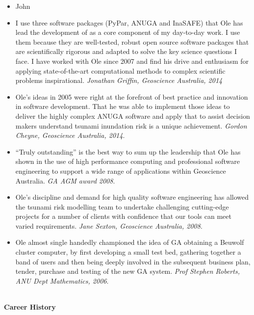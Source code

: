 \documentclass[11pt,a4paper]{article}
\begin{document}
\begin{itemize}
  \item John
  \item I use three software packages (PyPar, ANUGA and InaSAFE) that Ole has lead the development of as a core component of my day-to-day work. I use them because they are well-tested, robust open source software packages that are scientifically rigorous and adapted to solve the key science questions I face. I have worked with Ole since 2007 and find his drive and enthusiasm for applying state-of-the-art computational methods to complex scientific problems inspirational. \emph{Jonathan Griffin, Geoscience Australia, 2014}
  \item Ole’s ideas in 2005 were right at the forefront of best practice and innovation in software development. That he was able to implement those ideas to deliver the highly complex ANUGA software and apply that to assist decision makers understand tsunami inundation risk is a unique achievement. \emph{Gordon Cheyne, Geoscience Australia, 2014}.
  \item “Truly outstanding” is the best way to sum up the leadership that Ole has shown in the use of high performance computing and professional software engineering to support a wide range of applications within Geoscience Australia. \emph{GA AGM award 2008}.
  \item Ole’s discipline and demand for high quality software engineering has allowed the tsunami risk modelling team to undertake challenging cutting-edge projects for a number of clients with confidence that our tools can meet varied requirements. \emph{Jane Sexton, Geoscience Australia, 2008}.
  \item Ole almost single handedly championed the idea of GA obtaining a Beuwolf cluster computer, by first developing a small test bed, gathering together a band of users and then being deeply involved in the subsequent business plan, tender, purchase and testing of the new GA system. \emph{Prof Stephen Roberts, ANU Dept Mathematics, 2006}.
\end{itemize}

\begin{center}
  \hrulefill \\
  {\bf Career History} \\[-0.2cm]
  \hrulefill
\end{center}
\end{document}
